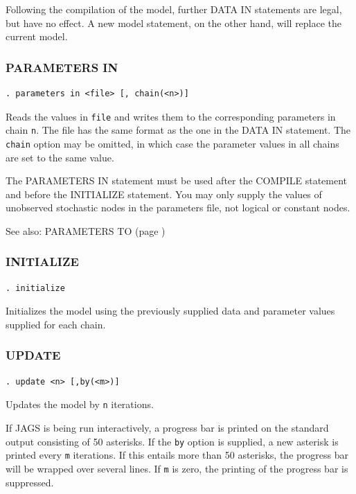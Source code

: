 \documentclass[11pt, a4paper, titlepage]{report}
\begin{document}
Following the compilation of the model, further DATA IN statements are
legal, but have no effect.  A new model statement, on the other hand,
will replace the current model.

\subsubsection{PARAMETERS IN}
\label{parameters:in}

\begin{verbatim}
. parameters in <file> [, chain(<n>)]
\end{verbatim}
Reads the values in \texttt{file} and writes them to the corresponding
parameters in chain \texttt{n}. The file has the same format as the
one in the DATA IN statement.  The \texttt{chain} option may be
omitted, in which case the parameter values in all chains are set to
the same value.

The PARAMETERS IN statement must be used after the COMPILE statement
and before the INITIALIZE statement.  You may only supply the values of
unobserved stochastic nodes in the parameters file, not logical or
constant nodes.

See also: PARAMETERS TO (page \pageref{parameters:to})

\subsubsection{INITIALIZE}

\begin{verbatim}
. initialize
\end{verbatim}
Initializes the model using the previously supplied data and parameter
values supplied for each chain.

\subsubsection{UPDATE}

\begin{verbatim}
. update <n> [,by(<m>)]
\end{verbatim}
Updates the model by \texttt{n} iterations. 

If JAGS is being run interactively, a progress bar is printed on the
standard output consisting of 50 asterisks. If the \texttt{by} option
is supplied, a new asterisk is printed every \texttt{m} iterations. If
this entails more than 50 asterisks, the progress bar will be wrapped
over several lines.  If \texttt{m} is zero, the printing of the
progress bar is suppressed.
\end{document}
